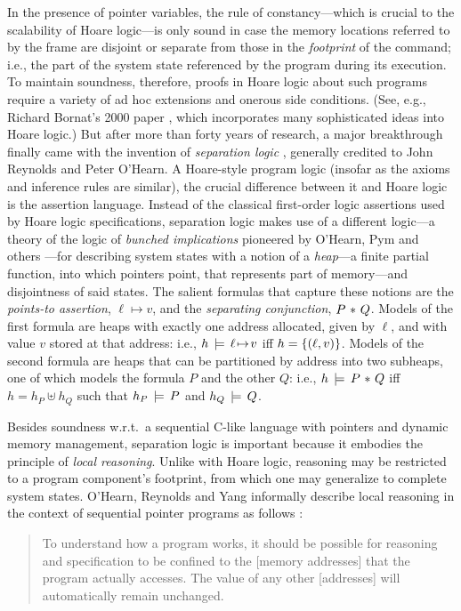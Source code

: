 \documentclass[11pt]{report}         %
\begin{document}
In the presence of pointer variables, the rule of constancy---which is crucial to the scalability of Hoare logic---is only sound in case the memory locations referred to by the frame are disjoint or separate from those in the \emph{footprint} of the command; i.e., the part of the system state referenced by the program during its execution. To maintain soundness, therefore, proofs in Hoare logic about such programs require a variety of ad hoc extensions and onerous side conditions. (See, e.g., Richard Bornat's 2000 paper \cite{DBLP:conf/mpc/Bornat00}, which incorporates many sophisticated ideas into Hoare logic.) But after more than forty years of research, a major breakthrough finally came with the invention of \emph{separation logic} \cite{DBLP:conf/lics/Reynolds02}, generally credited to John Reynolds and Peter O'Hearn. A Hoare-style program logic (insofar as the axioms and inference rules are similar), the crucial difference between it and Hoare logic is the assertion language. Instead of the classical first-order logic assertions used by Hoare logic specifications, separation logic makes use of a different logic---a theory of the logic of \emph{bunched implications} pioneered by O'Hearn, Pym and others \cite{DBLP:journals/bsl/OHearnP99,DBLP:journals/tcs/PymOY04}---for describing system states with a notion of a \emph{heap}---a finite partial function, into which pointers point, that represents part of memory---and disjointness of said states. The salient formulas that capture these notions are the \emph{points-to assertion}, $\ell \mapsto v$, and the \emph{separating conjunction}, $P \operatorname{\,\ast\,} Q$. Models of the first formula are heaps with exactly one address allocated, given by $\ell$, and with value $v$ stored at that address: i.e., $h \,\models\, \ell \!\mapsto\! v$ iff $h = \left\lbrace (\ell,v) \right\rbrace$. Models of the second formula are heaps that can be partitioned by address into two subheaps, one of which models the formula $P$ and the other $Q$: i.e., $h \,\models\, P \operatorname{\,\ast\,} Q$ iff $h = h_P \uplus h_Q$ such that $h_P \,\models\, P$ and $h_Q \,\models\, Q$. 

Besides soundness w.r.t.\ a sequential C-like language with pointers and dynamic memory management, separation logic is important because it embodies the principle of \emph{local reasoning}. Unlike with Hoare logic, reasoning may be restricted to a program component's footprint, from which one may generalize to complete system states. O'Hearn, Reynolds and Yang informally describe local reasoning in the context of sequential pointer programs as follows \cite{DBLP:conf/csl/OHearnRY01}: \begin{quotation}\noindent To understand how a program works, it should be possible for reasoning and specification to be confined to the [memory addresses] that the program actually accesses. The value of any other [addresses] will automatically remain unchanged.\end{quotation}
\end{document}
